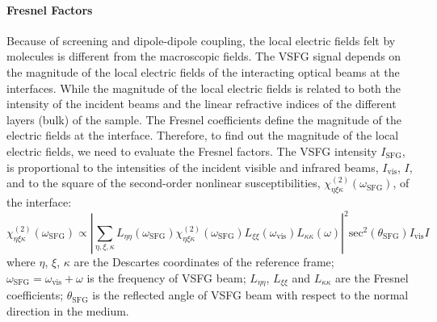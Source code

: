 \paragraph{Fresnel Factors}
Because of screening and dipole-dipole coupling, the local electric fields felt by molecules is different from the macroscopic fields\cite{Vanselow2012}. 
The VSFG signal depends on the magnitude of the local electric fields of the interacting optical beams at the interfaces. 
While the magnitude of the local electric fields is related to both the intensity of the incident beams and the linear refractive indices 
of the different layers (bulk) of the sample\cite{Khatib2016}. The Fresnel coefficients define the magnitude of the electric fields at the interface. 
Therefore, to find out the magnitude of the local electric fields, we need to evaluate the Fresnel factors. 
The VSFG intensity $I_{\text{SFG}}$, is proportional to the intensities of the incident visible and infrared beams, $I_{\text{vis}}$, $I$, 
and to the square of the second-order nonlinear susceptibilities,
$\chi_{\eta\xi\kappa}^{(2)}(\omega_{\text{SFG}})$, of the interface:
\begin{equation}
        \chi_{\eta\xi\kappa}^{(2)}(\omega_{\text{SFG}})\propto|\sum_{\eta,\xi,\kappa}L_{\eta\eta}(\omega_{\text{SFG}})\chi_{\eta\xi\kappa}^{(2)}(\omega_{\text{SFG}})L_{\xi\xi}(\omega_{\text{vis}})L_{\kappa\kappa}(\omega)|^2\text{sec}^2(\theta_{\text{SFG}})I_{\text{vis}}I
\label{eq:chi}
\end{equation}
where $\eta$, $\xi$, $\kappa$ are the Descartes coordinates of the reference frame;
$\omega_{\text{SFG}}=\omega_{\text{vis}}+\omega$ is the frequency of VSFG beam; 
$L_{\eta\eta}$, $L_{\xi\xi}$ and $L_{\kappa\kappa}$ are the Fresnel coefficients; 
$\theta_{\text{SFG}}$ is the reflected angle of VSFG beam with respect to the normal 
direction in the medium.

